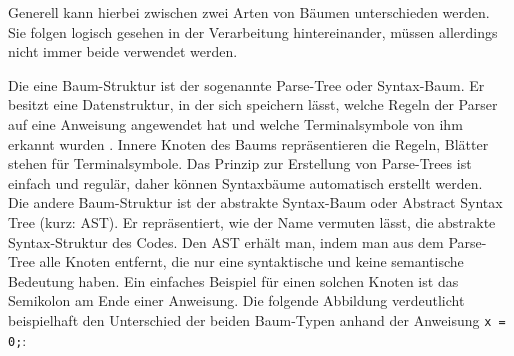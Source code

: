 Generell kann hierbei zwischen zwei Arten von Bäumen unterschieden werden. Sie folgen logisch gesehen in der Verarbeitung hintereinander, müssen allerdings nicht immer beide verwendet werden.

Die eine Baum-Struktur ist der sogenannte Parse-Tree oder Syntax-Baum. Er besitzt eine Datenstruktur, in der sich speichern lässt, welche Regeln der Parser auf eine Anweisung angewendet hat und welche Terminalsymbole von ihm erkannt wurden \cite{book:parrLang}. Innere Knoten des Baums repräsentieren die Regeln, Blätter stehen für Terminalsymbole. Das Prinzip zur Erstellung von Parse-Trees ist einfach und regulär, daher können Syntaxbäume automatisch erstellt werden.\\
Die andere Baum-Struktur ist der abstrakte Syntax-Baum oder Abstract Syntax Tree (kurz: AST). Er repräsentiert, wie der Name vermuten lässt, die abstrakte Syntax-Struktur des Codes. Den AST erhält man, indem man aus dem Parse-Tree alle Knoten entfernt, die nur eine syntaktische und keine semantische Bedeutung haben. Ein einfaches Beispiel für einen solchen Knoten ist das Semikolon am Ende einer Anweisung. Die folgende Abbildung verdeutlicht beispielhaft den Unterschied der beiden Baum-Typen anhand der Anweisung \texttt{x = 0;}:

